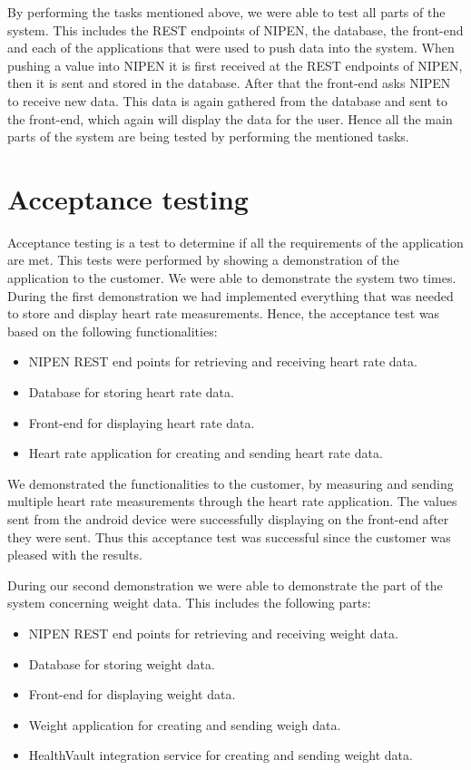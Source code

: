 By performing the tasks mentioned above, we were able to test all parts of the system.
This includes the REST endpoints of NIPEN, the database, the front-end and each of the applications that were used to push data into the system.
When pushing a value into NIPEN it is first received at the REST endpoints of NIPEN, then it is sent and stored in the database.
After that the front-end asks NIPEN to receive new data.
This data is again gathered from the database and sent to the front-end, which again will display the data for the user.
Hence all the main parts of the system are being tested by performing the mentioned tasks.

\section{Acceptance testing}

Acceptance testing is a test to determine if all the requirements of the application are met.
This tests were performed by showing a demonstration of the application to the customer.
We were able to demonstrate the system two times.
During the first demonstration we had implemented everything that was needed to store and display heart rate measurements.
Hence, the acceptance test was based on the following functionalities:

\begin{itemize}
\item NIPEN REST end points for retrieving and receiving heart rate data.
\item Database for storing heart rate data.
\item Front-end for displaying heart rate data.
\item Heart rate application for creating and sending heart rate data.
\end{itemize}

We demonstrated the functionalities to the customer, by measuring and sending multiple heart rate measurements through the heart rate application.
The values sent from the android device were successfully displaying on the front-end after they were sent.
Thus this acceptance test was successful since the customer was pleased with the results.

During our second demonstration we were able to demonstrate the part of the system concerning weight data.
This includes the following parts:

\begin{itemize}
\item NIPEN REST end points for retrieving and receiving weight data.
\item Database for storing weight data.
\item Front-end for displaying weight data.
\item Weight application for creating and sending weigh data.
\item HealthVault integration service for creating and sending weight data.
\end{itemize}

